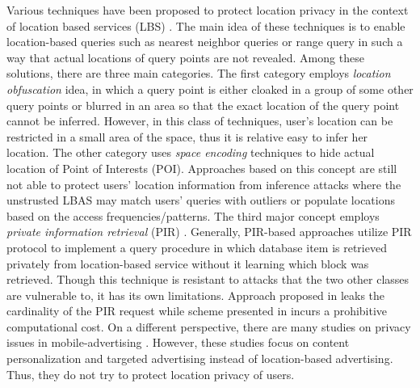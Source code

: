 Various techniques have been proposed to protect location privacy in the context of location based services (LBS) \cite{k-anonymity1, k-anonymity2, New_Casper, Space_Transformation, Lee:2007, Yiu:2010, Spiral, PIR-kNN}. The main idea of these techniques is to enable location-based queries such as nearest neighbor queries or range query in such a way that actual locations of query points are not revealed. Among these solutions, there are three main categories. The first category \cite{k-anonymity1, k-anonymity2, New_Casper} employs \textit{location obfuscation} idea, in which a query point is either cloaked in a group of some other query points or blurred in an area so that the exact location of the query point cannot be inferred. However, in this class of techniques, user's location can be restricted in a small area of the space, thus it is relative easy to infer her location. The other category \cite{Space_Transformation, Lee:2007, Yiu:2010} uses \textit{space encoding} techniques to hide actual location of Point of Interests (POI). Approaches based on this concept are still not able to protect users' location information from inference attacks where the unstrusted LBAS may match users' queries with outliers or populate locations based on the access frequencies/patterns. The third major concept employs \textit{private information retrieval} (PIR) \cite{Spiral, No_Need_Anonymizer, PIR-kNN}. Generally, PIR-based approaches utilize PIR protocol \cite{PIR_Origin} to implement a query procedure in which database item is retrieved privately from location-based service without it learning which block was retrieved. Though this technique is resistant to attacks that the two other classes are vulnerable to, it has its own limitations. 
Approach proposed in \cite{Spiral} leaks the cardinality of the PIR request while scheme presented in \cite{No_Need_Anonymizer} incurs a prohibitive computational cost. On a different perspective, there are many studies on privacy issues in mobile-advertising \cite{PAPMA1, PAPMA2, MoRePriv}. However, these studies focus on content personalization and targeted advertising instead of location-based advertising. Thus, they do not try to protect location privacy of users.


